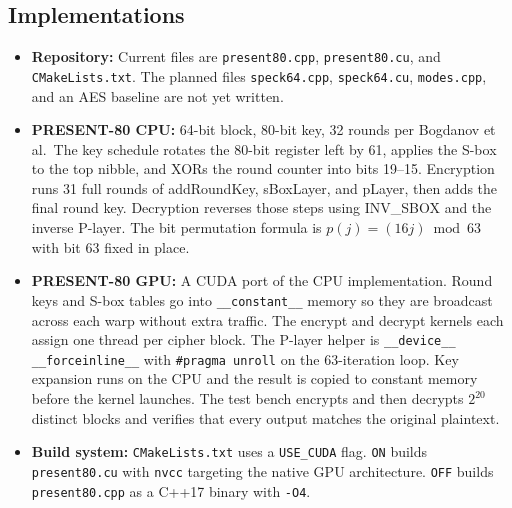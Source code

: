 \documentclass[10pt]{article}
\begin{document}
\subsection*{Implementations}
\begin{itemize}
  \item \textbf{Repository:} Current files are \texttt{present80.cpp}, \texttt{present80.cu},
        and \texttt{CMakeLists.txt}. The planned files \texttt{speck64.cpp},
        \texttt{speck64.cu}, \texttt{modes.cpp}, and an AES baseline are not yet written.

  \item \textbf{PRESENT-80 CPU:} 64-bit block, 80-bit key, 32 rounds per Bogdanov et al.\
        The key schedule rotates the 80-bit register left by 61, applies the S-box to
        the top nibble, and XORs the round counter into bits 19--15. Encryption runs 31
        full rounds of addRoundKey, sBoxLayer, and pLayer, then adds the final round key.
        Decryption reverses those steps using INV\_SBOX and the inverse P-layer. The bit
        permutation formula is $p(j) = (16j) \bmod 63$ with bit 63 fixed in place.

  \item \textbf{PRESENT-80 GPU:} A CUDA port of the CPU implementation. Round keys and
        S-box tables go into \texttt{\_\_constant\_\_} memory so they are broadcast across
        each warp without extra traffic. The encrypt and decrypt kernels each assign one
        thread per cipher block. The P-layer helper is \texttt{\_\_device\_\_ \_\_forceinline\_\_}
        with \texttt{\#pragma unroll} on the 63-iteration loop. Key expansion runs on the
        CPU and the result is copied to constant memory before the kernel launches. The
        test bench encrypts and then decrypts $2^{20}$ distinct blocks and verifies that
        every output matches the original plaintext.

  \item \textbf{Build system:} \texttt{CMakeLists.txt} uses a \texttt{USE\_CUDA} flag.
        \texttt{ON} builds \texttt{present80.cu} with \texttt{nvcc} targeting the native
        GPU architecture. \texttt{OFF} builds \texttt{present80.cpp} as a C++17 binary
        with \texttt{-O4}.
\end{itemize}
\end{document}
